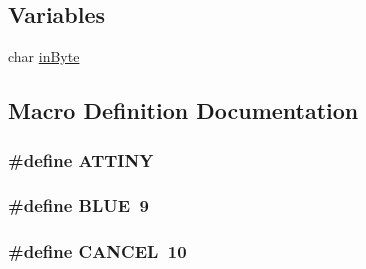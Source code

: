 \subsection*{Variables}
\begin{DoxyCompactItemize}
\item 
char \hyperlink{Tiny__HP__C4280__Enabler_8ino_ad9838cf4887e27fa4605d77307dec9e4}{in\-Byte}
\end{DoxyCompactItemize}


\subsection{Macro Definition Documentation}
\hypertarget{Tiny__HP__C4280__Enabler_8ino_a9ccf4cb5020d6bf39b5d9f879d16416e}{
\subsubsection[{A\-T\-T\-I\-N\-Y}]{\setlength{\rightskip}{0pt plus 5cm}\#define A\-T\-T\-I\-N\-Y}}\label{Tiny__HP__C4280__Enabler_8ino_a9ccf4cb5020d6bf39b5d9f879d16416e}
\hypertarget{Tiny__HP__C4280__Enabler_8ino_a79d10e672abb49ad63eeaa8aaef57c38}{
\subsubsection[{B\-L\-U\-E}]{\setlength{\rightskip}{0pt plus 5cm}\#define B\-L\-U\-E~9}}\label{Tiny__HP__C4280__Enabler_8ino_a79d10e672abb49ad63eeaa8aaef57c38}
\hypertarget{Tiny__HP__C4280__Enabler_8ino_aa498dfb3e15bd0b6ad9ef32a24990e8c}{
\subsubsection[{C\-A\-N\-C\-E\-L}]{\setlength{\rightskip}{0pt plus 5cm}\#define C\-A\-N\-C\-E\-L~10}}\label{Tiny__HP__C4280__Enabler_8ino_aa498dfb3e15bd0b6ad9ef32a24990e8c}
